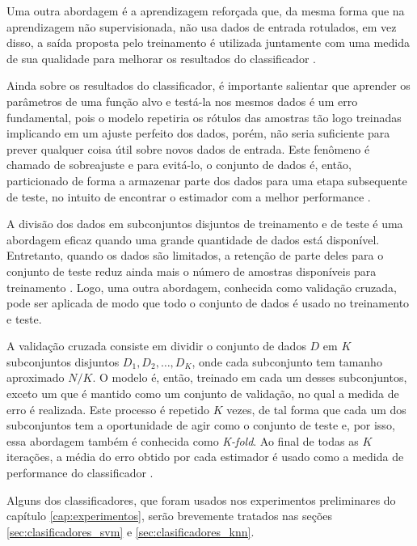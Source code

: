 Uma outra abordagem é a aprendizagem reforçada que, da mesma forma que na aprendizagem não supervisionada, não usa dados de entrada rotulados, em vez disso, a saída proposta pelo treinamento é utilizada juntamente com uma medida de sua qualidade para melhorar os resultados do classificador \citep{mostafa:12}.

Ainda sobre os resultados do classificador, é importante salientar que aprender os parâmetros de uma função alvo e testá-la nos mesmos dados é um erro fundamental, pois o modelo repetiria os rótulos das amostras tão logo treinadas implicando em um ajuste perfeito dos dados, porém, não seria suficiente para prever qualquer coisa útil sobre novos dados de entrada. Este fenômeno é chamado de sobreajuste e para evitá-lo, o conjunto de dados é, então, particionado de forma a armazenar parte dos dados para uma etapa subsequente de teste, no intuito de encontrar o estimador com a melhor performance \citep{mostafa:12}.

A divisão dos dados em subconjuntos disjuntos de treinamento e de teste é uma abordagem eficaz quando uma grande quantidade de dados está disponível. Entretanto, quando os dados são limitados, a retenção de parte deles para o conjunto de teste reduz ainda mais o número de amostras disponíveis para treinamento \citep{mitchell:97}. Logo, uma outra abordagem, conhecida como validação cruzada, pode ser aplicada de modo que todo o conjunto de dados é usado no treinamento e teste.

A validação cruzada consiste em dividir o conjunto de dados $D$ em $K$ subconjuntos disjuntos $D_1, D_2, \ldots, D_K$, onde cada subconjunto tem tamanho aproximado $N/K$. O modelo é, então, treinado em cada um desses subconjuntos, exceto um que é mantido como um conjunto de validação, no qual a medida de erro é realizada. Este processo é repetido $K$ vezes, de tal forma que cada um dos subconjuntos tem a oportunidade de agir como o conjunto de teste e, por isso, essa abordagem também é conhecida como \emph{K-fold}. Ao final de todas as $K$ iterações, a média do erro obtido por cada estimador é usado como a medida de performance do classificador \citep{mostafa:12}.

Alguns dos classificadores, que foram usados nos experimentos preliminares do capítulo \ref{cap:experimentos}, serão brevemente tratados nas seções \ref{sec:clasificadores_svm} e \ref{sec:clasificadores_knn}.


